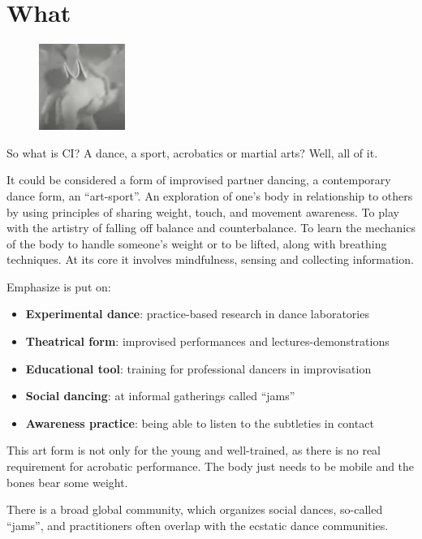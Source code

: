 \section{What}\label{sec:what}

\begin{figure}
\centering
\includegraphics[width=0.25\textwidth]{images/what}
\end{figure}

So what is CI? A dance, a sport, acrobatics or martial arts?
Well, all of it.

It could be considered a form of improvised partner dancing, a contemporary dance form, an ``art-sport''.
An exploration of one's body in relationship to others by using principles of sharing weight, touch, and movement awareness.
To play with the artistry of falling off balance and counterbalance.
To learn the mechanics of the body to handle someone's weight or to be lifted, along with breathing techniques.
At its core it involves mindfulness, sensing and collecting information.

Emphasize is put on:
\begin{itemize}
	\item \textbf{Experimental dance}: practice-based research in dance laboratories
	\item \textbf{Theatrical form}: improvised performances and lectures-demonstrations
	\item \textbf{Educational tool}: training for professional dancers in improvisation
	\item \textbf{Social dancing}: at informal gatherings called ``jams''
	\item \textbf{Awareness practice}: being able to listen to the subtleties in contact
\end{itemize}

This art form is not only for the young and well-trained, as there is no real requirement for acrobatic performance.
The body just needs to be mobile and the bones bear some weight.

There is a broad global community, which organizes social dances, so-called ``jams'', and practitioners often overlap with the ecstatic dance communities.


